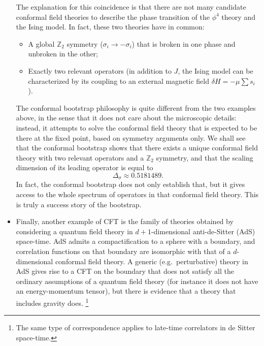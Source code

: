\documentclass[a4paper,12pt]{article}
\numberwithin{equation}{section}
\begin{document}
\begin{itemize}
The explanation for this coincidence is that there are not many candidate conformal field theories to describe the phase transition of the $\phi^4$ theory and the Ising model. In fact, these two theories have in common:
\begin{itemize}

\item
A global $\mathbb{Z}_2$ symmetry ($\sigma_i \to - \sigma_i$) that is broken in one phase and unbroken in the other;

\item
Exactly two relevant operators 
(in addition to $J$, the Ising model can be characterized by its coupling to an external magnetic field $\delta H = - \mu \sum s_i$).

\end{itemize}
%
The conformal bootstrap philosophy is quite different from the two examples above, in the sense that it does not care about the microscopic details: instead, it attempts to solve the conformal field theory that is expected to be there at the fixed point, based on symmetry arguments only. 
We shall see that the conformal bootstrap shows that there exists a unique conformal field theory with two relevant operators and a $\mathbb{Z}_2$ symmetry, and that the scaling dimension of its leading operator is equal to
\begin{equation}
	\Delta_\sigma \approx 0.5181489.
\end{equation}
In fact, the conformal bootstrap does not only establish that, but it gives access to the whole spectrum of operators in that conformal field theory.
This is truly a success story of the bootstrap.

\item
Finally, another example of CFT is the family of theories obtained by considering a quantum field theory in $d+1$-dimensional anti-de-Sitter (AdS) space-time. AdS admits a compactification to a sphere with a boundary, and correlation functions on that boundary are isomorphic with that of a $d$-dimensional conformal field theory.
A generic (e.g.~perturbative) theory in AdS gives rise to a CFT on the boundary that does not satisfy all the ordinary assumptions of a quantum field theory (for instance it does not have an energy-momentum tensor), but there is evidence that a theory that includes gravity does.%
%
\footnote{The same type of correspondence applies to late-time correlators in de Sitter space-time.}

\end{itemize}
\end{document}
